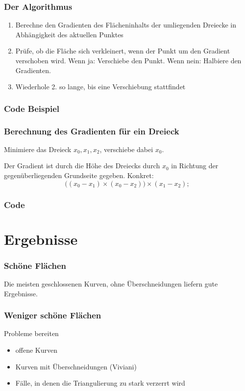 \documentclass{beamer}
\begin{document}
\begin{frame}
	\frametitle{Der Algorithmus}
	\begin{enumerate}[1.]
		\item
			Berechne den Gradienten des Flächeninhalts der umliegenden Dreiecke in Abhängigkeit des aktuellen Punktes
		\item
			Prüfe, ob die Fläche sich verkleinert, wenn der Punkt um den Gradient verschoben wird.
			Wenn ja: Verschiebe den Punkt.
			Wenn nein: Halbiere den Gradienten.
		\item
			Wiederhole 2. so lange, bis eine Verschiebung stattfindet
	\end{enumerate}
\end{frame}

\begin{frame}
	\frametitle{Code Beispiel}
	
\end{frame}

\begin{frame}
	\frametitle{Berechnung des Gradienten für ein Dreieck}
	Minimiere das Dreieck $x_0,x_1,x_2$, verschiebe dabei $x_0$.

	Der Gradient ist durch die Höhe des Dreiecks durch $x_0$ in Richtung der gegenüberliegenden Grundseite gegeben.
	Konkret:
	\[
		\big((x_0 - x_1) \times (x_0 - x_2)\big) \times (x_1 - x_2);
	\]
\end{frame}

\begin{frame}
	\frametitle{Code}
	
\end{frame}


\section{Ergebnisse}

\begin{frame}
	\frametitle{Schöne Flächen}
	Die meisten geschlossenen Kurven, ohne Überschneidungen liefern gute Ergebnisse.
\end{frame}

\begin{frame}
	\frametitle{Weniger schöne Flächen}
	Probleme bereiten
	\begin{itemize}
		\item
			offene Kurven 
		\item
			Kurven mit Überschneidungen (Viviani)
		\item
			Fälle, in denen die Triangulierung zu stark verzerrt wird
	\end{itemize}
\end{frame}
\end{document}
